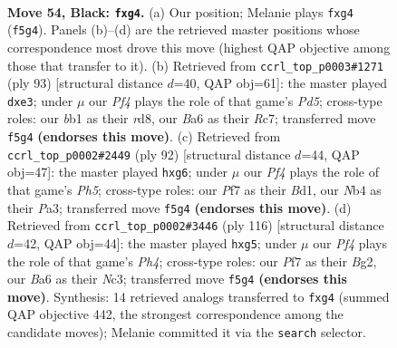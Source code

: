 \documentclass[11pt]{article}
\begin{document}
\clearpage

\begin{figure}[p]\centering
\begin{subfigure}{0.46\textwidth}\centering
\resizebox{\linewidth}{!}{%
\newchessgame
\chessboard[
  setfen={6k1/2r2p1p/b5p1/4Pp2/1n3PP1/7N/5K1P/1B6 b - - 0 54},
  showmover=false,
  pgfstyle=straightmove, color=movearrow, markmove={f5-g4}
]}
\caption{}
\end{subfigure}\hfill
\begin{subfigure}{0.46\textwidth}\centering
\resizebox{\linewidth}{!}{%
\newchessgame
\chessboard[
  setfen={3R4/2r5/2p2kp1/1nB1p3/3p2P1/1P2P3/5PK1/8 b - - 1 47},
  showmover=false,
  pgfstyle=straightmove, color=movearrow, markmove={d4-e3}
]}
\caption{}
\end{subfigure}
\\[4pt]
\begin{subfigure}{0.46\textwidth}\centering
\resizebox{\linewidth}{!}{%
\newchessgame
\chessboard[
  setfen={1r4k1/5p2/R3n1p1/2pp3P/6P1/P7/KP6/3B4 w - - 2 47},
  showmover=false,
  pgfstyle=straightmove, color=movearrow, markmove={h5-g6}
]}
\caption{}
\end{subfigure}\hfill
\begin{subfigure}{0.46\textwidth}\centering
\resizebox{\linewidth}{!}{%
\newchessgame
\chessboard[
  setfen={4b1k1/8/1n2pp2/6pp/4P2P/2N2PP1/6BK/8 w - - 0 59},
  showmover=false,
  pgfstyle=straightmove, color=movearrow, markmove={h4-g5}
]}
\caption{}
\end{subfigure}
\caption{\textbf{Move 54, Black: \texttt{fxg4}.} (a) Our position; Melanie plays \texttt{fxg4} (\texttt{f5g4}). Panels (b)--(d) are the retrieved master positions whose correspondence most drove this move (highest QAP objective among those that transfer to it). (b) Retrieved from \texttt{ccrl\_top\_p0003\#1271} (ply 93) [structural distance $d$=40, QAP obj=61]: the master played \texttt{dxe3}; under $\mu$ our \emph{Pf4} plays the role of that game's \emph{Pd5}; cross-type roles: our \emph{b}b1 as their \emph{r}d8, our \emph{B}a6 as their \emph{R}c7; transferred move \texttt{f5g4} \textbf{(endorses this move)}. (c) Retrieved from \texttt{ccrl\_top\_p0002\#2449} (ply 92) [structural distance $d$=44, QAP obj=47]: the master played \texttt{hxg6}; under $\mu$ our \emph{Pf4} plays the role of that game's \emph{Ph5}; cross-type roles: our \emph{P}f7 as their \emph{B}d1, our \emph{N}b4 as their \emph{P}a3; transferred move \texttt{f5g4} \textbf{(endorses this move)}. (d) Retrieved from \texttt{ccrl\_top\_p0002\#3446} (ply 116) [structural distance $d$=42, QAP obj=44]: the master played \texttt{hxg5}; under $\mu$ our \emph{Pf4} plays the role of that game's \emph{Ph4}; cross-type roles: our \emph{P}f7 as their \emph{B}g2, our \emph{B}a6 as their \emph{N}c3; transferred move \texttt{f5g4} \textbf{(endorses this move)}. Synthesis: 14 retrieved analogs transferred to \texttt{fxg4} (summed QAP objective 442, the strongest correspondence among the candidate moves); Melanie committed it via the \texttt{search} selector.}
\label{fig:thought-m107}
\end{figure}
\end{document}
